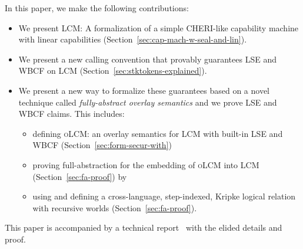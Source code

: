 \documentclass[acmsmall,review,showframe]{acmart}\settopmatter{printfolios=true,printccs=false,printacmref=false}
\newcommand{\trgcm}{\textsc{LCM}}
\newcommand{\srccm}{\textsc{oLCM}}
\begin{document}
In this paper, we make the following contributions:
\begin{itemize}
\item We present \trgcm{}: A formalization of a simple CHERI-like capability machine with linear capabilities (Section~\ref{sec:cap-mach-w-seal-and-lin}).
\item We present a new calling convention \stktokens{} that provably guarantees LSE and WBCF on \trgcm{} (Section~\ref{sec:stktokens-explained}).
\item We present a new way to formalize these guarantees based on a novel
  technique called \textit{fully-abstract overlay semantics} and we prove LSE
  and WBCF claims. This includes:
  \begin{itemize}
  \item defining \srccm{}: an overlay semantics for \trgcm{} with built-in LSE and WBCF (Section~\ref{sec:form-secur-with})
  \item proving full-abstraction for the embedding of \srccm{} into \trgcm{} (Section~\ref{sec:fa-proof}) by
  \item using and defining a cross-language, step-indexed, Kripke logical relation with recursive worlds (Section~\ref{sec:fa-proof}).
  \end{itemize}
\end{itemize}
This paper is accompanied by a technical report~\citep{technical_report} with the elided details and proof.


\end{document}
